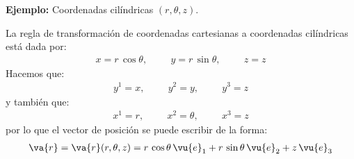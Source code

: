 \noindent
\textbf{Ejemplo: } Coordenadas cilíndricas $(r, \theta, z)$.
\par
La regla de transformación de coordenadas cartesianas a coordenadas cilíndricas está dada por:
\begin{align*}
x = r \, \cos \theta, \hspace{1cm} y = r \, \sin \theta, \hspace{1cm} z = z
\end{align*}
Hacemos que:
\begin{align*}
y^{1} = x, \hspace{1cm} y^{2} = y, \hspace{1cm} y^{3} = z
\end{align*}
y también que:
\begin{align*}
x^{1} = r, \hspace{1cm} x^{2} = \theta, \hspace{1cm} x^{3} = z
\end{align*}
por lo que el vector de posición se puede escribir de la forma:
\begin{align*}
\va{r} = \va{r} (r, \theta, z) = r \, \cos \theta \, \vu{e}_{1} + r \, \sin \theta \, \vu{e}_{2} + z \, \vu{e}_{3}
\end{align*}

